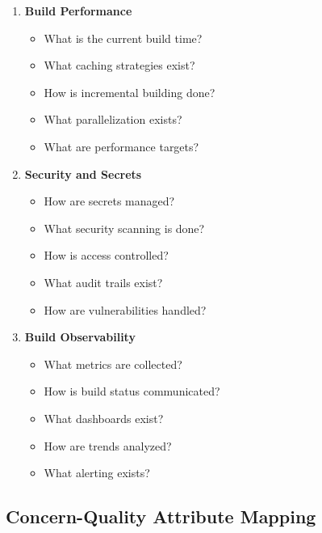 \documentclass[11pt,letterpaper]{article}
\begin{document}
\begin{enumerate}[label=\textbf{C\arabic*:}, leftmargin=2.5em]
    \item \textbf{Build Performance}
    \begin{itemize}[nosep]
        \item What is the current build time?
        \item What caching strategies exist?
        \item How is incremental building done?
        \item What parallelization exists?
        \item What are performance targets?
    \end{itemize}
    
    \item \textbf{Security and Secrets}
    \begin{itemize}[nosep]
        \item How are secrets managed?
        \item What security scanning is done?
        \item How is access controlled?
        \item What audit trails exist?
        \item How are vulnerabilities handled?
    \end{itemize}
    
    \item \textbf{Build Observability}
    \begin{itemize}[nosep]
        \item What metrics are collected?
        \item How is build status communicated?
        \item What dashboards exist?
        \item How are trends analyzed?
        \item What alerting exists?
    \end{itemize}
\end{enumerate}

\subsection{Concern-Quality Attribute Mapping}
\end{document}
